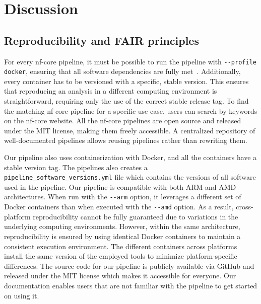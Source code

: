 \documentclass[12pt]{article}
\begin{document}
\section{Discussion}
\subsection{Reproducibility and FAIR principles}
For every nf-core pipeline, it must be possible to run the pipeline with \verb|--profile docker|, ensuring that all software dependencies are fully met~\cite{ewels2020nf}. Additionally, every container has to be versioned with a specific, stable version. This ensures that reproducing an analysis in a different computing environment is straightforward, requiring only the use of the correct stable release tag. To find the matching nf-core pipeline for a specific use case, users can search by keywords on the nf-core website. All the nf-core pipelines are open source and released under the MIT license, making them freely accessible. A centralized repository of well-documented pipelines allows reusing pipelines rather than rewriting them.

Our pipeline also uses containerization with Docker, and all the containers have a stable version tag. The pipelines also creates a \verb|pipeline_software_versions.yml| file which contains the versions of all software used in the pipeline. Our pipeline is compatible with both ARM and AMD architectures. When run with the \verb|--arm| option, it leverages a different set of Docker containers than when executed with the \verb|--amd| option. As a result, cross-platform reproducibility cannot be fully guaranteed due to variations in the underlying computing environments. However, within the same architecture, reproducibility is ensured by using identical Docker containers to maintain a consistent execution environment. The different containers across platforms install the same version of the employed tools to minimize platform-specific differences. The source code for our pipeline is publicly available via GitHub and released under the MIT license which makes it accessible for everyone. Our documentation enables users that are not familiar with the pipeline to get started on using it.
\end{document}
